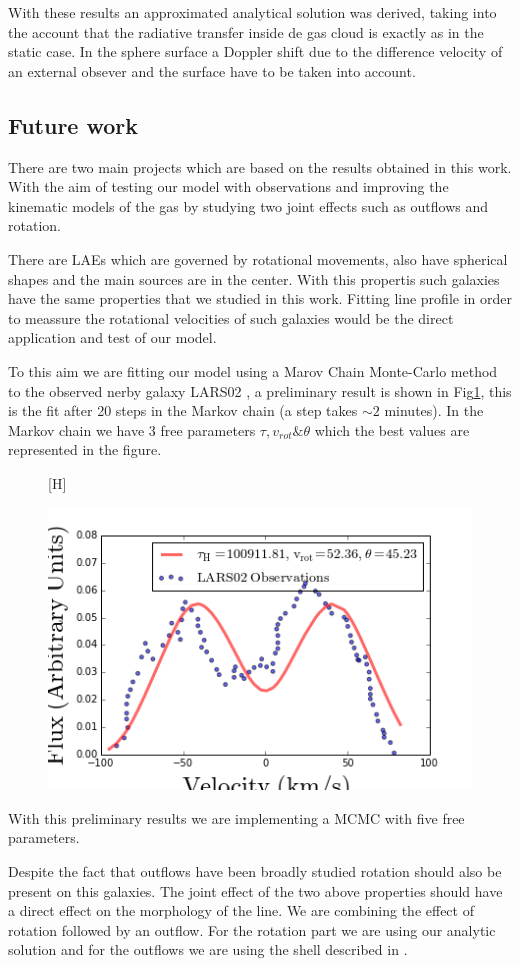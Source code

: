  
With these results an approximated analytical solution was derived, 
taking into the account that the radiative transfer inside de gas
cloud is exactly as in the static case. In the sphere surface
a Doppler shift due to the difference velocity of an external 
obsever and the surface have to be taken into account.  


\subsection{Future work}

There are two main projects which are based on the results obtained in 
this work. With the aim of testing our model with observations and
improving the kinematic models of the gas by studying two joint effects
such as outflows and rotation.  

There are LAEs which are governed by rotational movements, also 
have spherical shapes and the main \ly sources are in the center. 
With this propertis such galaxies have the same properties 
that we studied in this work.  
Fitting \ly line profile in order  to meassure the rotational 
velocities of such galaxies would be the direct application 
and test of our model. 

To this aim we are fitting our model using a Marov Chain Monte-Carlo 
method to the observed nerby galaxy LARS02 \citep{LARS}, a preliminary 
result is shown in Fig\ref{fig:LARS}, this is the fit after 20 steps
in the Markov chain (a step takes $\sim 2$ minutes). In the Markov
chain we have 3 free parameters $\tau, v_{rot} \& \theta$ which the best
values are represented in the figure.

\begin{figure}\label{fig:LARS}[H]
\begin{center}
\includegraphics[scale=0.8]{../Figures/LARS02_fit.png}
\end{center}
\end{figure}

With this preliminary results we are implementing a MCMC with five free
parameters.

Despite the fact that outflows have been broadly studied rotation should 
also be present on this galaxies. The joint effect of the two above properties 
should have a direct effect on the morphology of the \lya line. We are 
 combining the effect of rotation followed by an outflow. For the rotation
part we are using our analytic solution and for the outflows
we are using the shell described in \citep{Verhamme12}. 
